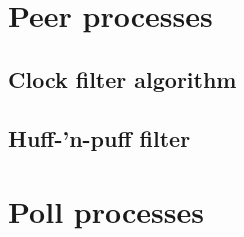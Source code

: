 \section{Peer processes}%
\label{sec:peer_processes}

\subsection{Clock filter algorithm}%
\label{sub:clock_filter_algorithm}

\subsection{Huff-'n-puff filter}%
\label{sub:huff_n_puff_filter}

\section{Poll processes}%
\label{sec:poll_processes}


